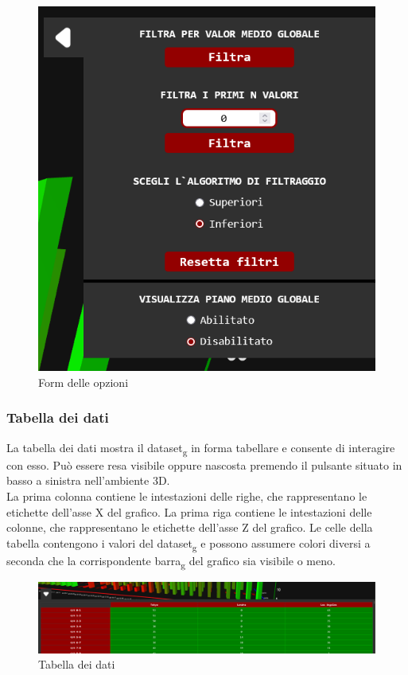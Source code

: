 \begin{figure}[ht!]
    \centering
    \includegraphics[scale=0.6]{template/images/env/options.png}
    \caption{Form delle opzioni}
\end{figure}

\subsubsection{Tabella dei dati}
La tabella dei dati mostra il dataset\textsubscript{g} in forma tabellare e consente di
interagire con esso. Può essere resa visibile oppure nascosta premendo il
pulsante situato in basso a sinistra nell'ambiente 3D.\\ La prima colonna
contiene le intestazioni delle righe, che rappresentano le etichette dell'asse
X del grafico. La prima riga contiene le intestazioni delle colonne, che
rappresentano le etichette dell'asse Z del grafico. Le celle della tabella
contengono i valori del dataset\textsubscript{g} e possono assumere colori diversi a seconda che
la corrispondente barra\textsubscript{g} del grafico sia visibile o meno.
\begin{figure}[ht!]
    \centering
    \includegraphics[scale=0.3]{template/images/env/table.png}
    \caption{Tabella dei dati}
\end{figure}